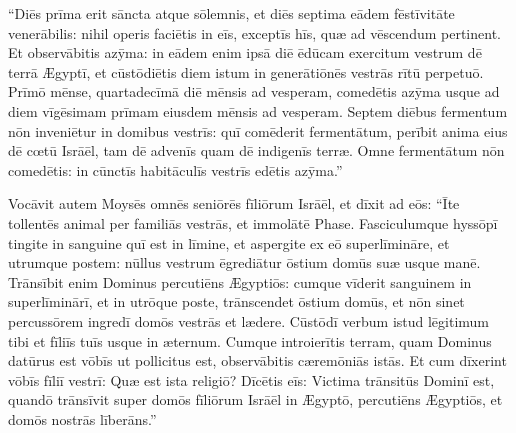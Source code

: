 ``Diēs prīma erit sāncta atque
sōlemnis, et diēs septima eādem fēstīvitāte
venerābilis: nihil operis faciētis in eīs,
exceptīs hīs, quæ ad vēscendum pertinent. Et
observābitis azȳma: in eādem enim ipsā diē ēdūcam
exercitum vestrum dē terrā Ægyptī, et cūstōdiētis diem istum in
generātiōnēs vestrās rītū perpetuō.   Prīmō mēnse, quartadecīmā diē mēnsis ad vesperam, comedētis
azȳma usque ad diem vīgēsimam prīmam eiusdem mēnsis ad
vesperam. Septem diēbus fermentum nōn inveniētur in domibus vestrīs:
quī comēderit fermentātum, perībit anima eius dē cœtū Isrāēl, tam dē
advenīs quam dē indigenīs terræ. Omne fermentātum nōn
comedētis: in cūnctīs habitāculīs vestrīs edētis azȳma.''

Vocāvit autem Moysēs omnēs seniōrēs fīliōrum Isrāēl, et
dīxit ad eōs: ``Īte tollentēs animal per familiās vestrās, et immolātē
Phase. Fasciculumque hyssōpī
tingite in sanguine quī est in līmine, et aspergite ex eō
superlīmināre, et utrumque postem: nūllus vestrum
ēgrediātur ōstium domūs suæ usque manē. Trānsībit enim Dominus
percutiēns Ægyptiōs: cumque vīderit sanguinem in
superlīminārī, et in utrōque poste,
trānscendet ōstium domūs, et nōn sinet
percussōrem ingredī domōs vestrās
et lædere. Cūstōdī verbum istud lēgitimum tibi et fīliīs
tuīs usque in æternum. Cumque introierītis terram, quam Dominus datūrus est vōbīs ut pollicitus
est, observābitis cæremōniās istās. Et cum dīxerint
vōbīs fīliī vestrī: Quæ est ista religiō? Dīcētis eīs:
Victima trānsitūs Dominī est, quandō trānsīvit super
domōs fīliōrum Isrāēl in Ægyptō, percutiēns Ægyptiōs, et domōs nostrās
līberāns.''

